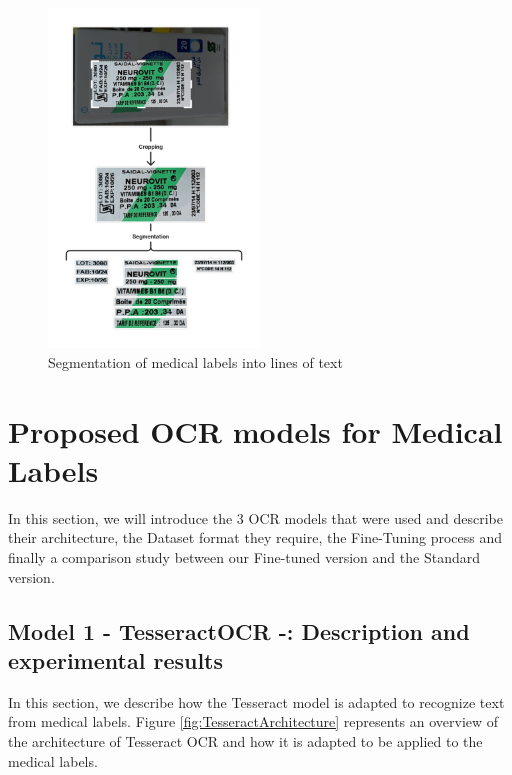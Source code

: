 \begin{figure}[H]
    \centering
    \includegraphics[width=0.5\textwidth]{Figures/Chapter 3/segmented_lines.png}
    \caption{Segmentation of medical labels into lines of text}
    \label{fig:segmentationoflabels}
\end{figure}


\section{Proposed OCR models for Medical Labels}
 In this section, we will introduce the 3 OCR models that were used and describe their architecture, the Dataset format they require, the Fine-Tuning process and finally a comparison study between our Fine-tuned version and the Standard version.
\subsection{Model 1 - TesseractOCR -: Description and experimental results}

In this section, we describe how the Tesseract model is adapted to recognize text from medical labels. Figure \ref{fig:TesseractArchitecture} represents an overview of the architecture of Tesseract OCR and how it is adapted to be applied to the medical labels.

